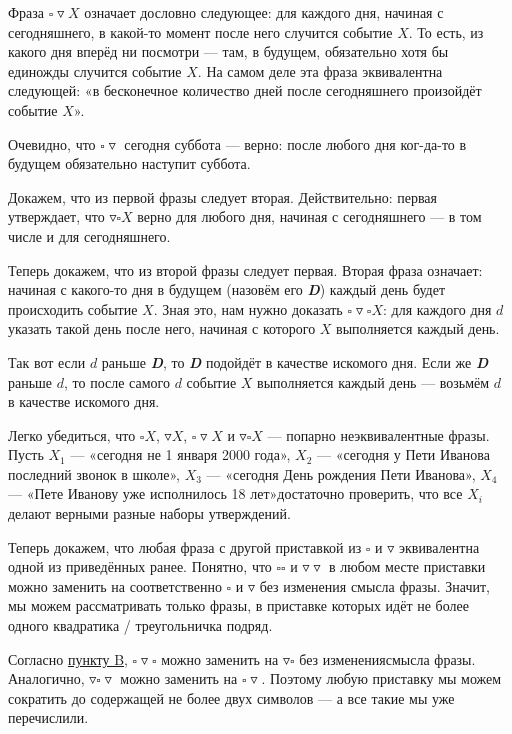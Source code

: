 \def\sq{\square}
\def\td{\triangledown}

\begin{itemize}
\itA Фраза $\sq\td X$ означает дословно следующее: для каждого дня, начиная с сегодняшнего, в какой-то момент после него случится событие $X$. То есть, из какого дня вперёд ни посмотри — там, в будущем, обязательно хотя бы единожды случится событие $X$. На самом деле эта фраза эквивалентна следующей: «в бесконечное количество дней после сегодняшнего произойдёт событие $X$».

Очевидно, что $\sq\td \text{ сегодня суббота}$ — верно: после любого дня ког-\linebreak да-то в будущем обязательно наступит суббота.

\itB \label{logicb} Докажем, что из первой фразы следует вторая. Действительно: первая утверждает, что $\td\sq X$ верно для любого дня, начиная с сегодняшнего — в том числе и для сегодняшнего.

Теперь докажем, что из второй фразы следует первая. Вторая фраза означает: начиная с какого-то дня в будущем (назовём его {\itshape\bfseries D}) каждый день будет происходить событие $X$. Зная это, нам нужно доказать $\sq\td\sq X$: для каждого дня $d$ указать такой день после него, начиная с которого $X$ выполняется каждый день.

Так вот если $d$ раньше {\itshape\bfseries D}, то {\itshape\bfseries D} подойдёт в качестве искомого дня. Если же {\itshape\bfseries D} раньше $d$, то после самого $d$ событие $X$ выполняется каждый день — возьмём $d$ в качестве искомого дня.

\itC Легко убедиться, что $\sq X$, $\td X$, $\sq\td X$ и $\td\sq X$ — попарно неэквивалентные фразы. Пусть $X_1$ — «сегодня не 1 января 2000 года», $X_2$ — «сегодня у Пети Иванова последний звонок в школе», $X_3$ — «сегодня День рождения Пети Иванова», $X_4$ — «Пете Иванову уже исполнилось 18 лет»\scolon достаточно проверить, что все $X_i$ делают верными разные наборы утверждений.

Теперь докажем, что любая фраза с другой приставкой из $\sq$ и $\td$ эквивалентна одной из приведённых ранее. Понятно, что $\sq\sq$ и $\td\td$ в любом месте приставки можно заменить на соответственно $\sq$ и $\td$ без изменения смысла фразы. Значит, мы можем рассматривать только фразы, в приставке которых идёт не более одного квадратика / треугольничка подряд.

Согласно \hyperref[logicb]{пункту B}, $\sq\td\sq$ можно заменить на $\td\sq$ без изменения\linebreak смысла фразы. Аналогично, $\td\sq\td$ можно заменить на $\sq\td$. Поэтому любую приставку мы можем сократить до содержащей не более двух символов — а все такие мы уже перечислили.

\end{itemize}